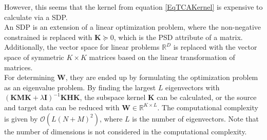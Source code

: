 However, this seems that the kernel from equation \eqref{EqTCAKernel} is expensive to calculate via a \ac{SDP}.\cite{Pan.2011}\\
An \acs{SDP} is an extension of a linear optimization problem, where the non-negative constrained is replaced with $\mathbf{K}\succeq 0$, which is the \acs{PSD} attribute of a matrix. Additionally, the vector space for linear problems $\mathbb{R}^D$ is replaced with the vector space of symmetric $K\times K$ matrices based on the linear transformation of matrices.\cite{Gartner.2012}\\
For determining $\mathbf{W}$, they are ended up by formulating the optimization problem as an eigenvalue problem.
By finding the largest $L$ eigenvectors with $(\mathbf{KMK}+\lambda \mathbf{I})^{-1} \mathbf{KHK}$, the subspace kernel $\mathbf{K}$ can be calculated, or the source and target data can be reduced with $\mathbf{W} \in \mathbb{R}^{K\times L}$.
The computational complexity is given by $\mathcal{O}(L(N+M)^2)$, where $L$ is the number of eigenvectors.\cite{Pan.2011}
Note that the number of dimensions is not considered in the computational complexity.

